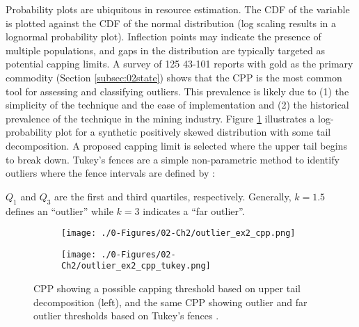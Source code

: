 Probability plots are ubiquitous in resource estimation. The \gls{CDF} of the variable is plotted against the \gls{CDF} of the normal distribution (log scaling results in a lognormal probability plot). Inflection points may indicate the presence of multiple populations, and gaps in the distribution are typically targeted as potential capping limits. A survey of 125 43-101 reports with gold as the primary commodity (Section \ref{subsec:02state}) shows that the \gls{CPP} is the most common tool for assessing and classifying outliers. This prevalence is likely due to (1) the simplicity of the technique and the ease of implementation and (2) the historical prevalence of the technique in the mining industry. Figure \ref{fig:cpp} illustrates a log-probability plot for a synthetic positively skewed distribution with some tail decomposition. A proposed capping limit is selected where the upper tail begins to break down. Tukey's fences are a simple non-parametric method to identify outliers where the fence intervals are defined by \citep{tukey1977exploratory}:
\begin{equation}
    [Q_{1}-k(Q_{3}-Q_{1})), Q_{3}+k(Q_{3}-Q_{1}))]
    \label{eq:tukey}
\end{equation}

$Q_{1}$ and $Q_{3}$ are the first and third quartiles, respectively. Generally, $k=1.5$ defines an ``outlier'' while $k=3$ indicates a ``far outlier''.

\begin{figure}[!htb]
    \begin{subfigure}{0.5\textwidth}
        \centering
        \texttt{[image: ./0-Figures/02-Ch2/outlier\_ex2\_cpp.png]}
    \end{subfigure}
    \begin{subfigure}{0.5\textwidth}
        \centering
        \texttt{[image: ./0-Figures/02-Ch2/outlier\_ex2\_cpp\_tukey.png]}
    \end{subfigure}
    \caption{\gls{CPP} showing a possible capping threshold based on upper tail decomposition (left), and the same \gls{CPP} showing outlier and far outlier thresholds based on Tukey's fences \citep{tukey1977exploratory}.}
    \label{fig:cpp}
\end{figure}

